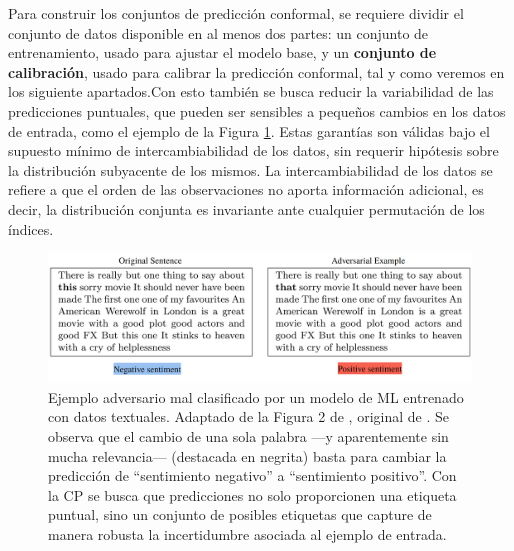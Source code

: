 Para construir los conjuntos de predicción conformal, se requiere dividir el conjunto de datos disponible en al menos dos partes: un conjunto de entrenamiento, usado para ajustar el modelo base, y un \textbf{conjunto de calibración}, usado para calibrar la predicción conformal, tal y como veremos en los siguiente apartados.Con esto también se busca reducir la variabilidad de las predicciones puntuales, que pueden ser sensibles a pequeños cambios en los datos de entrada, como el ejemplo de la Figura \ref{fig:adversarial_example}. Estas garantías son válidas bajo el supuesto mínimo de intercambiabilidad de los datos, sin requerir hipótesis sobre la distribución subyacente de los mismos. La intercambiabilidad de los datos se refiere a que el orden de las observaciones no aporta información adicional, es decir, la distribución conjunta es invariante ante cualquier permutación de los índices. 

\begin{figure}[htbp]
    \centering
    \includegraphics[width=\textwidth]{capitulos/cap_02/imagenes/adversarial_example.png}
    \caption[
        Ejemplo adversario mal clasificado por un modelo de \textit{machine learning} entrenado con datos textuales.
    ]{
        Ejemplo adversario mal clasificado por un modelo de \acrshort{ML} entrenado con datos textuales.
        Adaptado de la Figura 2 de \cite{hullermeier2021}, original de \cite{sato2018}.
        Se observa que el cambio de una sola palabra ---y aparentemente sin mucha relevancia--- (destacada en negrita) basta para cambiar la predicción de ``sentimiento negativo'' a ``sentimiento positivo''.
        Con la \acrshort{CP} se busca que predicciones no solo proporcionen una etiqueta puntual, sino un conjunto de posibles etiquetas que capture de manera robusta la incertidumbre asociada al ejemplo de entrada.
    } 
    \label{fig:adversarial_example}
\end{figure}



